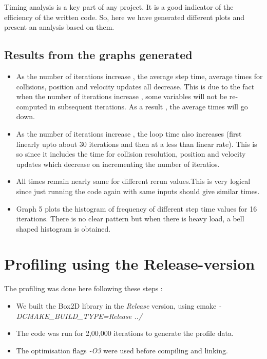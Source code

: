 \documentclass[a4paper,11pt]{article}
\begin{document}
Timing analysis is a key part of any project. It is a good indicator of the efficiency of the written code. So, here we have generated 
different plots and present an analysis based on them.

\subsection{Results from the graphs generated}

\begin{itemize}
\item As the number of iterations increase , the average step time, average times for collisions, position and velocity updates all decrease. This is due to the fact when the number of iterations increase , some variables will not be re-computed in subsequent iterations.
As a result , the average times will go down.
\item As the number of iterations increase , the loop time also increases (first linearly upto about 30 iterations and then at a less than linear rate). This is so since it includes the time for collision resolution, position and velocity updates which decrease on incrementing the number of iteratios.
\item All times remain nearly same for different rerun values.This is very logical since just running the code again with same inputs should give similar times.
\item Graph 5 plots the histogram of frequency of different step time values for 16 iterations. There is no clear pattern but when there is heavy load, a bell shaped histogram is obtained.
\end{itemize}

\section{Profiling using the Release-version}

The profiling was done here following these steps :

\begin{itemize}

\item We built the Box2D library in the \emph{Release} version, using cmake \emph{-DCMAKE\_BUILD\_TYPE=Release ../}
\item The code was run for 2,00,000 iterations to generate the profile data. 
\item The optimisation flags \emph{-O3} were used before compiling and linking.

\end{itemize}
\end{document}
